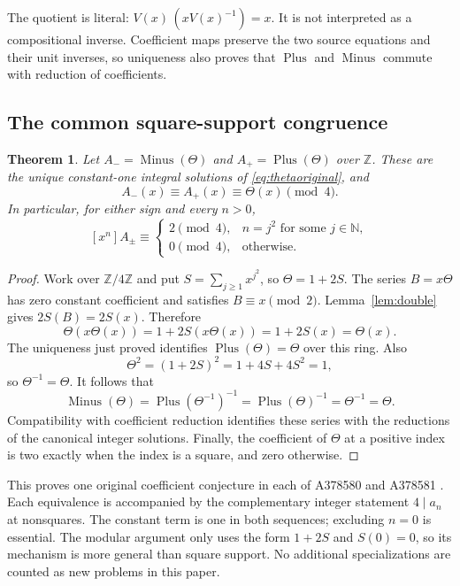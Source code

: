 \documentclass[11pt,a4paper]{article}
\newtheorem{theorem}{Theorem}[section]
\theoremstyle{remark}
\newcommand{\Z}{\mathbb Z}
\newcommand{\N}{\mathbb N}
\newcommand{\Plus}{\operatorname{Plus}}
\newcommand{\Minus}{\operatorname{Minus}}
\begin{document}
The quotient is literal: $V(x)\,(xV(x)^{-1})=x$. It is not interpreted as a
compositional inverse. Coefficient maps preserve the two source equations
and their unit inverses, so uniqueness also proves that $\Plus$ and
$\Minus$ commute with reduction of coefficients.

\subsection{The common square-support congruence}

\begin{theorem}\label{thm:theta}
Let $A_-=\Minus(\Theta)$ and $A_+=\Plus(\Theta)$ over $\Z$.
These are the unique constant-one integral solutions of
\eqref{eq:thetaoriginal}, and
\[
 A_-(x)\equiv A_+(x)\equiv\Theta(x)\pmod4.
\]
In particular, for either sign and every $n>0$,
\[
 [x^n]A_\pm\equiv
 \begin{cases}
  2\pmod4,&n=j^2\text{ for some }j\in\N,\\
  0\pmod4,&\text{otherwise}.
 \end{cases}
\]
\end{theorem}

\begin{proof}
Work over $\Z/4\Z$ and put $S=\sum_{j\ge1}x^{j^2}$, so $\Theta=1+2S$.
The series $B=x\Theta$ has zero constant coefficient and satisfies
$B\equiv x\pmod2$. Lemma~\ref{lem:double} gives $2S(B)=2S(x)$.
Therefore
\[
 \Theta(x\Theta(x))=1+2S(x\Theta(x))=1+2S(x)=\Theta(x).
\]
The uniqueness just proved identifies $\Plus(\Theta)=\Theta$ over this
ring. Also
\[
 \Theta^2=(1+2S)^2=1+4S+4S^2=1,
\]
so $\Theta^{-1}=\Theta$. It follows that
\[
 \Minus(\Theta)=\Plus(\Theta^{-1})^{-1}
 =\Plus(\Theta)^{-1}=\Theta^{-1}=\Theta.
\]
Compatibility with coefficient reduction identifies these series with
the reductions of the canonical integer solutions. Finally, the
coefficient of $\Theta$ at a positive index is two exactly when the
index is a square, and zero otherwise.
\end{proof}

This proves one original coefficient conjecture in each of A378580
and A378581 \cite{oeis580,oeis581}. Each equivalence is accompanied
by the complementary integer statement $4\mid a_n$ at nonsquares.
The constant term is one in both sequences; excluding $n=0$ is essential.
The modular argument only uses the form $1+2S$ and $S(0)=0$, so its
mechanism is more general than square support. No additional specializations
are counted as new problems in this paper.
\end{document}
